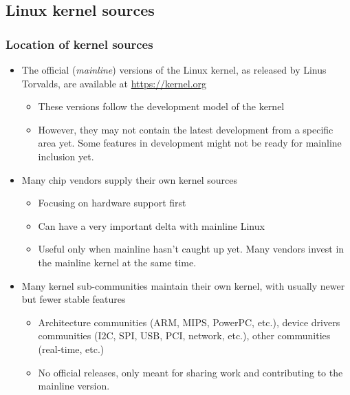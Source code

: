 \subsection{Linux kernel sources}

\begin{frame}
  \frametitle{Location of kernel sources}
  \begin{itemize}
  \item The official ({\em mainline}) versions of the Linux kernel, as released by Linus
    Torvalds, are available at \url{https://kernel.org}
    \begin{itemize}
    \item These versions follow the development model of the kernel
    \item However, they may not contain the latest development from a
      specific area yet. Some features in development might not be
      ready for mainline inclusion yet.
    \end{itemize}
  \item Many chip vendors supply their own kernel sources
    \begin{itemize}
    \item Focusing on hardware support first
    \item Can have a very important delta with mainline Linux
    \item Useful only when mainline hasn't caught up yet. Many vendors
          invest in the mainline kernel at the same time.
    \end{itemize}
  \item Many kernel sub-communities maintain their own kernel, with
    usually newer but fewer stable features
    \begin{itemize}
    \item Architecture communities (ARM, MIPS, PowerPC, etc.), device
      drivers communities (I2C, SPI, USB, PCI, network, etc.), other
      communities (real-time, etc.)
    \item No official releases, only meant for sharing work and
      contributing to the mainline version.
    \end{itemize}
  \end{itemize}
\end{frame}


